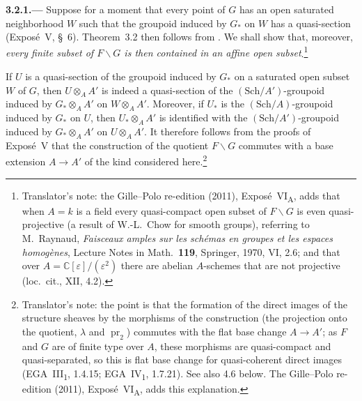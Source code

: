 
\medskip
{}\label{par:sga3-VIA-3.2.1}%
\noindent\textbf{3.2.1.---}
Suppose for a moment that every point of \(G\) has an open saturated
neighborhood \(W\) such that the groupoid induced by \(G_*\) on \(W\)
has a quasi-section (Expos\'e~V, \S~6). Theorem~3.2 then follows from
. We shall show that, moreover, \emph{every finite
subset of \(F\backslash G\) is then contained in an affine open subset}.\footnote{Translator's note: the Gille--Polo re-edition
(2011), Exposé~VI\textsubscript{A}, adds that when \(A=k\) is a field every quasi-compact open subset
of \(F\backslash G\) is even quasi-projective (a result of W.-L.~Chow for smooth groups), referring to
M.~Raynaud, \emph{Faisceaux amples sur les schémas en groupes et les espaces homogènes}, Lecture
Notes in Math.\ \textbf{119}, Springer, 1970, VI, 2.6; and that over \(A=\mathbb C[\varepsilon]/(\varepsilon^2)\)
there are abelian \(A\)-schemes that are not projective (loc.\ cit., XII, 4.2).}

If \(U\) is a quasi-section of the groupoid induced by \(G_*\) on a
saturated open subset \(W\) of \(G\), then \(U\otimes_AA'\) is indeed a
quasi-section of the \((\mathrm{Sch}/A')\)-groupoid induced by
\(G_*\otimes_AA'\) on \(W\otimes_AA'\). Moreover, if \(U_*\) is the
\((\mathrm{Sch}/A)\)-groupoid induced by \(G_*\) on \(U\), then
\(U_*\otimes_AA'\) is identified with the
\((\mathrm{Sch}/A')\)-groupoid induced by \(G_*\otimes_AA'\) on
\(U\otimes_AA'\). It therefore follows from the proofs of Expos\'e~V that the
construction of the quotient \(F\backslash G\) commutes with a base extension
\(A\to A'\) of the kind considered here.\footnote{Translator's note: the point is that the formation of
the direct images of the structure sheaves by the morphisms of the construction (the projection
onto the quotient, \(\lambda\) and \(\operatorname{pr}_2\)) commutes with the flat base change
\(A\to A'\); as \(F\) and \(G\) are of finite type over \(A\), these morphisms are quasi-compact and
quasi-separated, so this is flat base change for quasi-coherent direct images (EGA~III\textsubscript{1},
1.4.15; EGA~IV\textsubscript{1}, 1.7.21). See also 4.6 below. The Gille--Polo re-edition (2011),
Exposé~VI\textsubscript{A}, adds this explanation.}

